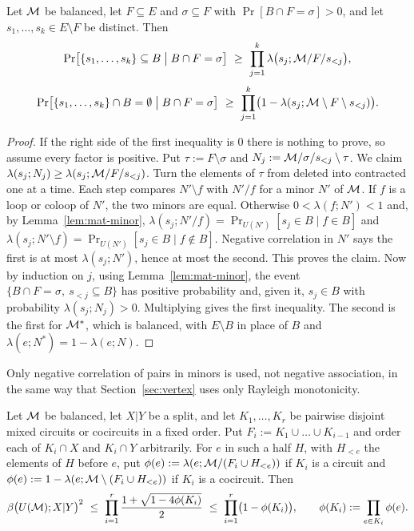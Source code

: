 \begin{lemma}\label{lem:mat-global}
Let $\mathcal{M}$ be balanced, let $F\subseteq E$ and $\sigma\subseteq F$ with $\Pr[B\cap F=\sigma]>0$, and let $s_1,\dots,s_k\in E\setminus F$ be distinct. Then
\[
  \Pr\bigl[\{s_1,\dots,s_k\}\subseteq B\bigm|B\cap F=\sigma\bigr]\ \ge\ \prod_{j=1}^k\lambda\bigl(s_j;\cM/F/s_{<j}\bigr),
\]
\[
  \Pr\bigl[\{s_1,\dots,s_k\}\cap B=\emptyset\bigm|B\cap F=\sigma\bigr]\ \ge\ \prod_{j=1}^k\bigl(1-\lambda(s_j;\cM\setminus F\setminus s_{<j})\bigr).
\]
\end{lemma}

\begin{proof}
If the right side of the first inequality is $0$ there is nothing to prove, so assume every factor is positive. Put $\tau:=F\setminus\sigma$ and $N_j:=\mathcal{M}/\sigma/s_{<j}\setminus\tau$. We claim $\lambda(s_j;N_j)\ge\lambda(s_j;\mathcal{M}/F/s_{<j})$. Turn the elements of $\tau$ from deleted into contracted one at a time. Each step compares $N'\setminus f$ with $N'/f$ for a minor $N'$ of $\mathcal{M}$. If $f$ is a loop or coloop of $N'$, the two minors are equal. Otherwise $0<\lambda(f;N')<1$ and, by Lemma~\ref{lem:mat-minor}, $\lambda(s_j;N'/f)=\Pr_{U(N')}[s_j\in B\mid f\in B]$ and $\lambda(s_j;N'\setminus f)=\Pr_{U(N')}[s_j\in B\mid f\notin B]$. Negative correlation in $N'$ says the first is at most $\lambda(s_j;N')$, hence at most the second. This proves the claim. Now by induction on $j$, using Lemma~\ref{lem:mat-minor}, the event $\{B\cap F=\sigma,\ s_{<j}\subseteq B\}$ has positive probability and, given it, $s_j\in B$ with probability $\lambda(s_j;N_j)>0$. Multiplying gives the first inequality. The second is the first for $\mathcal{M}^*$, which is balanced, with $E\setminus B$ in place of $B$ and $\lambda(e;N^*)=1-\lambda(e;N)$.
\end{proof}

Only negative correlation of pairs in minors is used, not negative association, in the same way that Section~\ref{sec:vertex} uses only Rayleigh monotonicity.

\begin{theorem}\label{thm:mat-global}
Let $\mathcal{M}$ be balanced, let $X|Y$ be a split, and let $K_1,\dots,K_r$ be pairwise disjoint mixed circuits or cocircuits in a fixed order. Put $F_i:=K_1\cup\dots\cup K_{i-1}$ and order each of $K_i\cap X$ and $K_i\cap Y$ arbitrarily. For $e$ in such a half $H$, with $H_{<e}$ the elements of $H$ before $e$, put $\phi(e):=\lambda(e;\mathcal{M}/(F_i\cup H_{<e}))$ if $K_i$ is a circuit and $\phi(e):=1-\lambda(e;\mathcal{M}\setminus(F_i\cup H_{<e}))$ if $K_i$ is a cocircuit. Then
\[
  \beta\bigl(U(\cM);X|Y\bigr)^2\ \le\ \prod_{i=1}^r\frac{1+\sqrt{1-4\phi(K_i)}}2\ \le\ \prod_{i=1}^r\bigl(1-\phi(K_i)\bigr),\qquad\phi(K_i):=\prod_{e\in K_i}\phi(e).
\]
\end{theorem}

